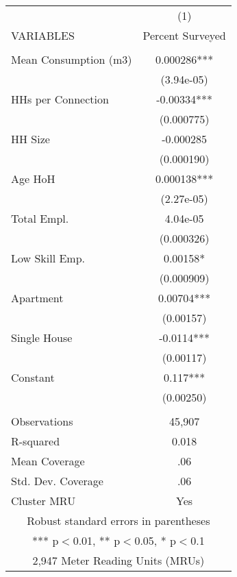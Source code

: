 \begin{tabular}{lc} \hline
 & (1) \\
VARIABLES & Percent Surveyed \\ \hline
 &  \\
Mean Consumption (m3) & 0.000286*** \\
 & (3.94e-05) \\
HHs per Connection & -0.00334*** \\
 & (0.000775) \\
HH Size & -0.000285 \\
 & (0.000190) \\
Age HoH & 0.000138*** \\
 & (2.27e-05) \\
Total Empl. & 4.04e-05 \\
 & (0.000326) \\
Low Skill Emp. & 0.00158* \\
 & (0.000909) \\
Apartment & 0.00704*** \\
 & (0.00157) \\
Single House & -0.0114*** \\
 & (0.00117) \\
Constant & 0.117*** \\
 & (0.00250) \\
 &  \\
Observations & 45,907 \\
R-squared & 0.018 \\
Mean Coverage & .06 \\
Std. Dev. Coverage & .06 \\
 Cluster MRU & Yes \\ \hline
\multicolumn{2}{c}{ Robust standard errors in parentheses} \\
\multicolumn{2}{c}{ *** p$<$0.01, ** p$<$0.05, * p$<$0.1} \\
\multicolumn{2}{c}{ 2,947 Meter Reading Units (MRUs)} \\
\end{tabular}

